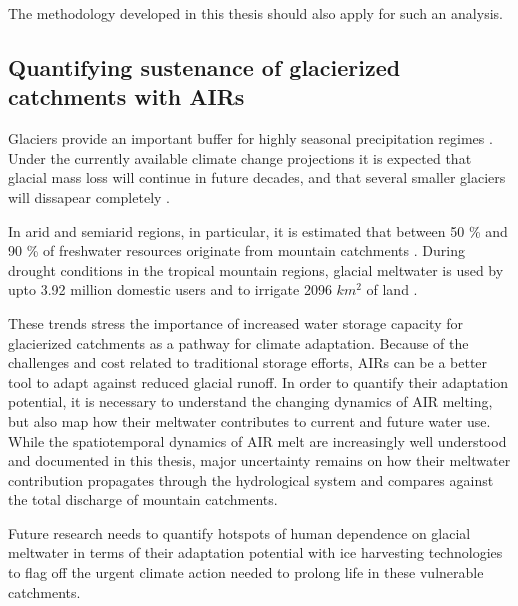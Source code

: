The methodology developed in this thesis should also apply for such an analysis.

\subsection{Quantifying sustenance of glacierized catchments with AIRs}

Glaciers provide an important buffer for highly seasonal precipitation regimes
\citep{kaserContributionPotentialGlaciers2010}. Under the currently available climate change projections it is
expected that glacial mass loss will continue in future decades, and that several smaller glaciers will
dissapear completely \citep{rabatelCurrentStateGlaciers2013}. 

In arid and semiarid regions, in particular, it is estimated that between 50 \% and 90 \% of freshwater
resources originate from mountain catchments \citep{messerliMountainsWorldVulnerable2004}. During drought
conditions in the tropical mountain regions, glacial meltwater is used by upto 3.92 million domestic users and
to irrigate 2096 $km^2$ of land \citep{buytaertGlacialMeltContent2017}.  

These trends stress the importance of increased water storage capacity for glacierized catchments as a pathway
for climate adaptation. Because of the challenges and cost related to traditional storage efforts, AIRs can be
a better tool to adapt against reduced glacial runoff. In order to quantify their adaptation potential, it
is necessary to understand the changing dynamics of AIR melting, but also map how their meltwater contributes to
current and future water use. While the spatiotemporal dynamics of AIR melt are increasingly well understood and
documented in this thesis, major uncertainty remains on how their meltwater contribution propagates through the
hydrological system and compares against the total discharge of mountain catchments. 

Future research needs to quantify hotspots of human dependence on glacial meltwater in terms of their adaptation
potential with ice harvesting technologies to flag off the urgent climate action needed to prolong life in these
vulnerable catchments.



